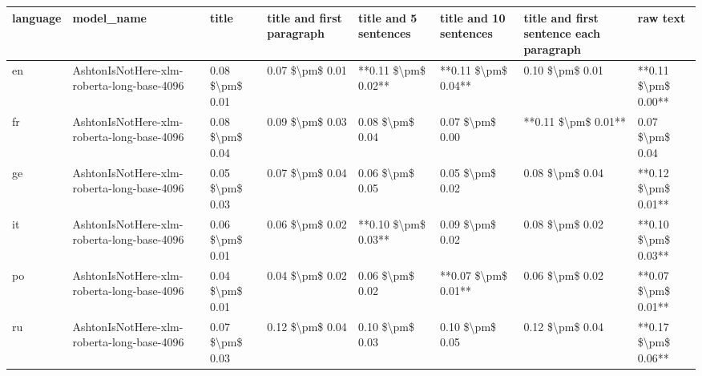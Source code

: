 \begin{tabular}{llllllll}
\toprule
language &                                 model\_name &           title & title and first paragraph & title and 5 sentences & title and 10 sentences & title and first sentence each paragraph &            raw text \\
\midrule
      en & AshtonIsNotHere-xlm-roberta-long-base-4096 & 0.08 \$\textbackslash pm\$ 0.01 &           0.07 \$\textbackslash pm\$ 0.01 &   **0.11 \$\textbackslash pm\$ 0.02** &    **0.11 \$\textbackslash pm\$ 0.04** &                         0.10 \$\textbackslash pm\$ 0.01 & **0.11 \$\textbackslash pm\$ 0.00** \\
      fr & AshtonIsNotHere-xlm-roberta-long-base-4096 & 0.08 \$\textbackslash pm\$ 0.04 &           0.09 \$\textbackslash pm\$ 0.03 &       0.08 \$\textbackslash pm\$ 0.04 &        0.07 \$\textbackslash pm\$ 0.00 &                     **0.11 \$\textbackslash pm\$ 0.01** &     0.07 \$\textbackslash pm\$ 0.04 \\
      ge & AshtonIsNotHere-xlm-roberta-long-base-4096 & 0.05 \$\textbackslash pm\$ 0.03 &           0.07 \$\textbackslash pm\$ 0.04 &       0.06 \$\textbackslash pm\$ 0.05 &        0.05 \$\textbackslash pm\$ 0.02 &                         0.08 \$\textbackslash pm\$ 0.04 & **0.12 \$\textbackslash pm\$ 0.01** \\
      it & AshtonIsNotHere-xlm-roberta-long-base-4096 & 0.06 \$\textbackslash pm\$ 0.01 &           0.06 \$\textbackslash pm\$ 0.02 &   **0.10 \$\textbackslash pm\$ 0.03** &        0.09 \$\textbackslash pm\$ 0.02 &                         0.08 \$\textbackslash pm\$ 0.02 & **0.10 \$\textbackslash pm\$ 0.03** \\
      po & AshtonIsNotHere-xlm-roberta-long-base-4096 & 0.04 \$\textbackslash pm\$ 0.01 &           0.04 \$\textbackslash pm\$ 0.02 &       0.06 \$\textbackslash pm\$ 0.02 &    **0.07 \$\textbackslash pm\$ 0.01** &                         0.06 \$\textbackslash pm\$ 0.02 & **0.07 \$\textbackslash pm\$ 0.01** \\
      ru & AshtonIsNotHere-xlm-roberta-long-base-4096 & 0.07 \$\textbackslash pm\$ 0.03 &           0.12 \$\textbackslash pm\$ 0.04 &       0.10 \$\textbackslash pm\$ 0.03 &        0.10 \$\textbackslash pm\$ 0.05 &                         0.12 \$\textbackslash pm\$ 0.04 & **0.17 \$\textbackslash pm\$ 0.06** \\
\bottomrule
\end{tabular}
